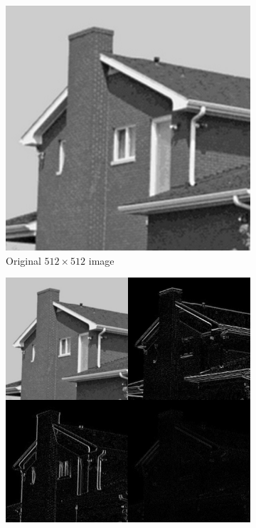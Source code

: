 \begin{figure}
\centering
\begin{subfigure}{0.4\textwidth}
  \includegraphics[width=\textwidth]{Chapter3/Images/house.png}
  \caption{Original $512\times 512$ image}
\end{subfigure}
\begin{subfigure}{0.4\textwidth}
  \includegraphics[width=\textwidth]{Chapter3/Images/dwt1.png}

\end{subfigure}
\end{figure}
